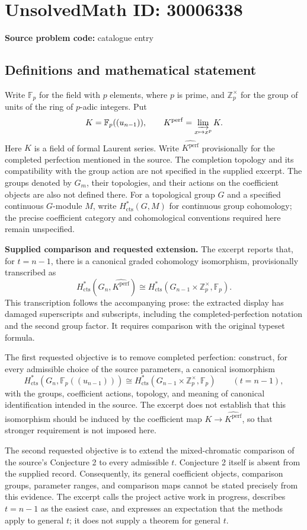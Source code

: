 \documentclass[11pt]{article}
\newcommand{\Z}{\mathbb{Z}}
\newcommand{\F}{\mathbb{F}}
\begin{document}
\section*{UnsolvedMath ID: 30006338}
\textbf{Source problem code:} catalogue entry
\subsection{Definitions and mathematical statement}
Write \(\F_p\) for the field with \(p\) elements, where \(p\) is prime, and \(\Z_p^\times\) for the group of units of the ring of \(p\)-adic integers. Put
\[
K=\F_p((u_{n-1})),\qquad K^{\mathrm{perf}}=\varinjlim_{x\mapsto x^p}K.
\]
Here \(K\) is a field of formal Laurent series. Write \(\widehat{K^{\mathrm{perf}}}\) provisionally for the completed perfection mentioned in the source. The completion topology and its compatibility with the group action are not specified in the supplied excerpt. The groups denoted by \(G_m\), their topologies, and their actions on the coefficient objects are also not defined there. For a topological group \(G\) and a specified continuous \(G\)-module \(M\), write \(H^*_{\mathrm{cts}}(G,M)\) for continuous group cohomology; the precise coefficient category and cohomological conventions required here remain unspecified.

\textbf{Supplied comparison and requested extension.} The excerpt reports that, for \(t=n-1\), there is a canonical graded cohomology isomorphism, provisionally transcribed as
\[
H^*_{\mathrm{cts}}\!\left(G_n,\widehat{K^{\mathrm{perf}}}\right)
\cong
H^*_{\mathrm{cts}}\!\left(G_{n-1}\times\Z_p^\times,\F_p\right).
\]
This transcription follows the accompanying prose: the extracted display has damaged superscripts and subscripts, including the completed-perfection notation and the second group factor. It requires comparison with the original typeset formula.

The first requested objective is to remove completed perfection: construct, for every admissible choice of the source parameters, a canonical isomorphism
\[
H^*_{\mathrm{cts}}\!\left(G_n,\F_p((u_{n-1}))\right)
\cong
H^*_{\mathrm{cts}}\!\left(G_{n-1}\times\Z_p^\times,\F_p\right)
\qquad (t=n-1),
\]
with the groups, coefficient actions, topology, and meaning of canonical identification intended in the source. The excerpt does not establish that this isomorphism should be induced by the coefficient map \(K\to\widehat{K^{\mathrm{perf}}}\), so that stronger requirement is not imposed here.

The second requested objective is to extend the mixed-chromatic comparison of the source's Conjecture 2 to every admissible \(t\). Conjecture 2 itself is absent from the supplied record. Consequently, its general coefficient objects, comparison groups, parameter ranges, and comparison maps cannot be stated precisely from this evidence. The excerpt calls the project active work in progress, describes \(t=n-1\) as the easiest case, and expresses an expectation that the methods apply to general \(t\); it does not supply a theorem for general \(t\).
\end{document}
